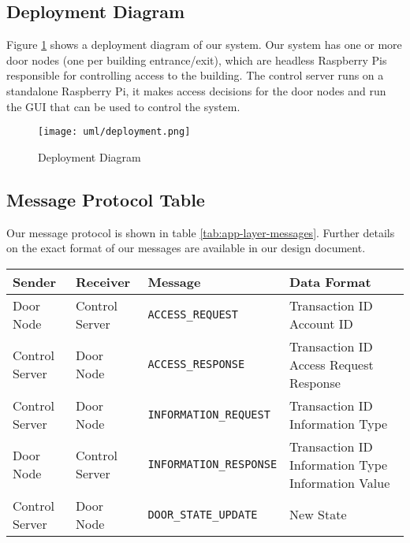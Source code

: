 
\subsection{Deployment Diagram}

Figure \ref{fig:deployment-diagram} shows a deployment diagram of our system.
Our system has one or more door nodes (one per building entrance/exit), which
are headless Raspberry Pis responsible for controlling access to the building.
The control server runs on a standalone Raspberry Pi, it makes access decisions
for the door nodes and run the GUI that can be used to control the system.

\begin{figure}[!htb]
\centering
\texttt{[image: uml/deployment.png]}
\caption{Deployment Diagram}
\label{fig:deployment-diagram}
\end{figure}

\subsection{Message Protocol Table}

Our message protocol is shown in table \ref{tab:app-layer-messages}. Further
details on the exact format of our messages are available in our design
document.

\begin{table*}[htb]
\begin{tabular}{ l | l | l | p{4.5cm} }
\toprule
Sender & Receiver & Message & Data Format\\
\midrule
Door Node & Control Server & \verb|ACCESS_REQUEST| &
Transaction ID \newline Account ID\\
\hline
Control Server & Door Node & \verb|ACCESS_RESPONSE| &
Transaction ID \newline Access Request Response\\
\hline
Control Server & Door Node & \verb|INFORMATION_REQUEST| &
Transaction ID \newline Information Type\\
\hline
Door Node & Control Server & \verb|INFORMATION_RESPONSE| &
Transaction ID \newline Information Type \newline Information Value\\
\hline
Control Server & Door Node & \verb|DOOR_STATE_UPDATE| & New State\\
\bottomrule
\end{tabular}
\caption{Application Layer Messages}
\label{tab:app-layer-messages}
\end{table*}

